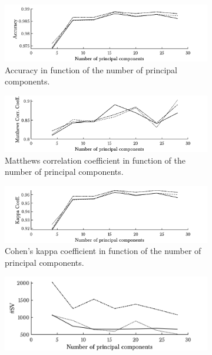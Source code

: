 \begin{figure}[ht!]
        \begin{subfigure}[b]{.97\textwidth}  
            \centering 
            \includegraphics[width=.98\textwidth]{parts/chap-4/img-svm/nl-pca/acc.png}
            \caption{Accuracy in function of the number of principal components.} 
        \end{subfigure}
        \vfill
        \begin{subfigure}[b]{.97\textwidth}  
            \centering 
            \includegraphics[width=.98\textwidth]{parts/chap-4/img-svm/nl-pca/mcc.png}
            \caption{Matthews correlation coefficient in function of the number of principal components.} 
        \end{subfigure}
        \vfill
        \begin{subfigure}[b]{.97\textwidth}  
            \centering 
            \includegraphics[width=.98\textwidth]{parts/chap-4/img-svm/nl-pca/kappa.png}
            \caption{Cohen's kappa coefficient in function of the number of principal components.} 
        \end{subfigure}
        \begin{subfigure}[b]{.97\textwidth}  
            \centering 
            \includegraphics[width=.98\textwidth]{parts/chap-4/img-svm/nl-pca/sv.png}

\end{subfigure}
\end{figure}
